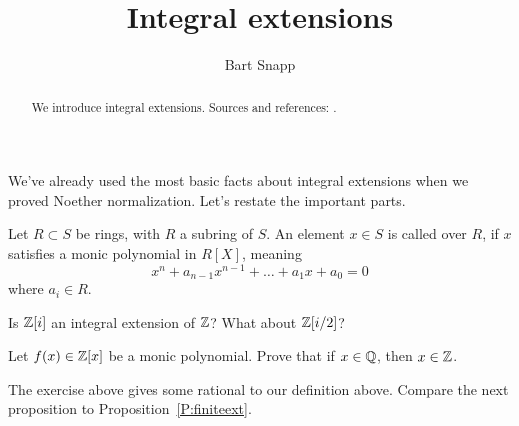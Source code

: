 \documentclass{ximera}
\author{Bart Snapp}
\title{Integral extensions}
\begin{document}
\begin{abstract}
  We introduce integral extensions. Sources and references:
  \cite{AM1969}.
\end{abstract}
\maketitle


We've already used the most basic facts about integral extensions when
we proved Noether normalization. Let's restate the important parts.
\begin{definition}
  Let $R\subset S$ be rings, with $R$ a subring of $S$. An element
  $x\in S$ is called  over $R$, if $x$ satisfies a monic
  polynomial in $R[X]$, meaning
  \[
  x^n + a_{n-1} x^{n-1} + \dots + a_1 x + a_0  = 0
  \]
  where $a_i\in R$.
\end{definition}


\begin{exercise}
  Is $\mathbb Z[i]$ an integral extension of $\mathbb Z$? What about $\mathbb Z[i/2]$?
\end{exercise}


\begin{exercise}
  Let $f(x)\in\mathbb Z[x]$ be a monic polynomial. Prove that if $x\in\mathbb Q$,
  then $x\in\mathbb Z$.
\end{exercise}




The exercise above gives some rational to our definition
above. Compare the next proposition to Proposition~\ref{P:finiteext}.
\end{document}
